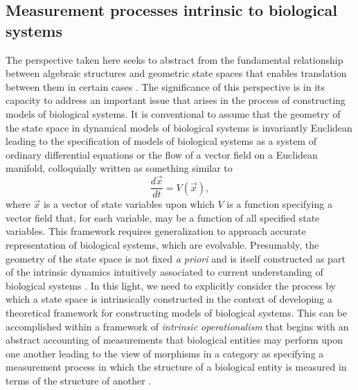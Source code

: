 \documentclass[aps,twocolumn]{revtex4-1}
\begin{document}
\subsection{Measurement processes intrinsic to biological systems}
The perspective taken here seeks to abstract from the fundamental relationship between algebraic structures and geometric state spaces that enables translation between them in certain cases \cite{Nestruev2002}. The significance of this perspective is in its capacity to address an important issue that arises in the process of constructing models of biological systems. It is conventional to assume that the geometry of the state space in dynamical models of biological systems is invariantly Euclidean leading to the specification of models of biological systems as a system of ordinary differential equations or the flow of a vector field on a Euclidean manifold, colloquially written as something similar to
$$
\frac{d \vec{x}}{dt} = V(\vec{x}),
$$ 
where $\vec{x}$ is a vector of state variables upon which $V$ is a function specifying a vector field that, for each variable, may be a function of all specified state variables. This framework requires generalization to approach accurate representation of biological systems, which are evolvable. Presumably, the geometry of the state space is not fixed {\it a priori} and is itself constructed as part of the intrinsic dynamics intuitively associated to current understanding of biological systems \cite{Fontana1994,Fontana1996}. In this light, we need to explicitly consider the process by which a state space is intrinsically constructed in the context of developing a theoretical framework for constructing models of biological systems. This can be accomplished within a framework of {\it intrinsic operationalism} \cite{Bridgman1927} that begins with an abstract accounting of measurements that biological entities may perform upon one another leading to the view of morphisms in a category as specifying a measurement process in which the structure of a biological entity is measured in terms of the structure of another \cite{Rosen1978}.
 
\end{document}

